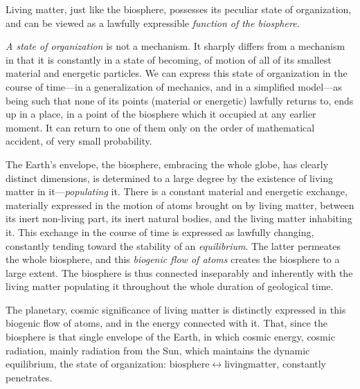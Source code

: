 Living matter, just like the biosphere, possesses its peculiar state of
organization, and can be viewed as a lawfully expressible \emph{function of the
biosphere.}

\emph{A state of organization} is not a mechanism.  It sharply differs from a
mechanism in that it is constantly in a state of
becoming, of motion of
all of its smallest material and energetic particles.  We can express this
state of organization in the course of time---in a generalization of mechanics,
and in a simplified model---as being such that none of its points (material or
energetic) lawfully returns to, ends up in a place, in a point of the biosphere
which it occupied at any earlier moment.  It can return to one of them only on
the order of mathematical accident, of very small probability.

The Earth's envelope, the biosphere, embracing the whole globe, has clearly
distinct dimensions, is determined to a large degree by the existence of living
matter in it---\emph{populating} it.  There is a
constant material and energetic exchange, materially expressed in the motion of
atoms brought on by living matter, between its inert non-living part, its inert
natural bodies, and the living matter inhabiting it.  This exchange in the
course of time is expressed as lawfully changing, constantly tending toward the
stability of an \emph{equilibrium}.  The latter
permeates the whole biosphere, and this \emph{biogenic flow of
atoms} creates the biosphere to a large
extent.  The biosphere is thus connected inseparably and inherently with the
living matter populating it throughout the whole duration of geological time.

The planetary, cosmic significance of living matter is distinctly expressed in
this biogenic flow of atoms, and in the energy connected with it.  That, since
the biosphere is that single envelope of the Earth, in which cosmic energy,
cosmic radiation, mainly radiation from the Sun, which maintains the dynamic
equilibrium, the state of organization: $\mathrm{biosphere} \leftrightarrow
\mathrm{living matter}$, constantly penetrates.

